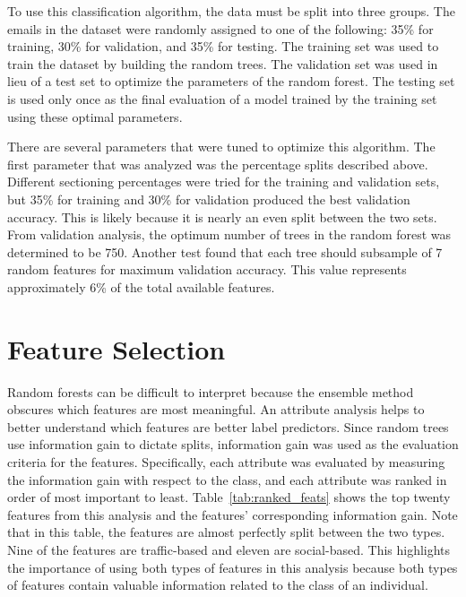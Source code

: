 \documentclass[12pt]{report}
\begin{document}
To use this classification algorithm, the data must be split into three groups.
The emails in the dataset were randomly assigned to one of the following: 35\% for training, 30\% for validation, and 35\% for testing.
The training set was used to train the dataset by building the random trees.
The validation set was used in lieu of a test set to optimize the parameters of the random forest.
The testing set is used only once as the final evaluation of a model trained by the training set using these optimal parameters.

There are several parameters that were tuned to optimize this algorithm.
The first parameter that was analyzed was the percentage splits described above. 
Different sectioning percentages were tried for the training and validation sets, but 35\% for training and 30\% for validation produced the best validation accuracy.
This is likely because it is nearly an even split between the two sets.
From validation analysis, the optimum number of trees in the random forest was determined to be 750.
Another test found that each tree should subsample of 7 random features for maximum validation accuracy.
This value represents approximately 6\% of the total available features.



\section{Feature Selection}
Random forests can be difficult to interpret because the ensemble method obscures which features are most meaningful.
An attribute analysis helps to better understand which features are better label predictors.
Since random trees use information gain to dictate splits, information gain was used as the evaluation criteria for the features.
Specifically, each attribute was evaluated by measuring the information gain with respect to the class, and each attribute was ranked in order of most important to least.
Table~\ref{tab:ranked_feats} shows the top twenty features from this analysis and the features' corresponding information gain.  
Note that in this table, the features are almost perfectly split between the two types.
Nine of the features are traffic-based and eleven are social-based.
This highlights the importance of using both types of features in this analysis because both types of features contain valuable information related to the class of an individual.
\end{document}
